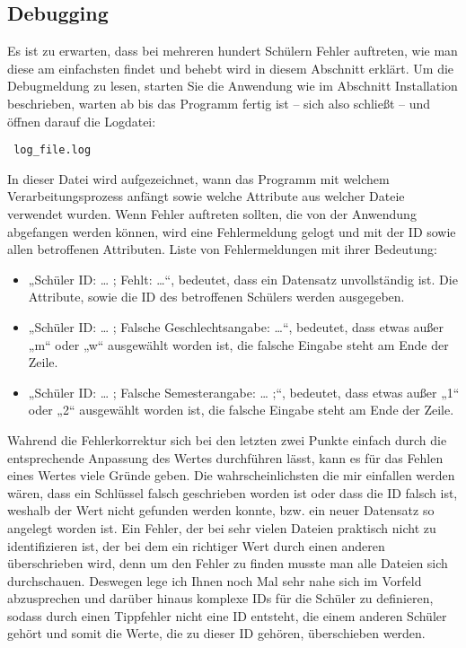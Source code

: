 \documentclass[a4paper,10pt]{scrartcl}
\begin{document}
   \subsection{Debugging}
   Es ist zu erwarten, dass bei mehreren hundert Schülern Fehler auftreten, wie man diese am einfachsten findet und behebt wird in diesem Abschnitt erklärt.
   Um die Debugmeldung zu lesen, starten Sie die Anwendung wie im Abschnitt Installation beschrieben, warten ab bis das Programm fertig ist – sich also schließt – und öffnen darauf die Logdatei:
   \begin{verbatim} log_file.log \end{verbatim}
   In dieser Datei wird aufgezeichnet, wann das Programm mit welchem Verarbeitungsprozess anfängt sowie welche Attribute aus welcher Dateie verwendet wurden.
   \newline
   Wenn Fehler auftreten sollten, die von der Anwendung abgefangen werden können, wird eine Fehlermeldung gelogt und mit der ID sowie allen betroffenen Attributen. 
   Liste von Fehlermeldungen mit ihrer Bedeutung:
   \begin{itemize}
      \item „Schüler ID: … ; Fehlt: …“, bedeutet, dass ein Datensatz unvollständig ist. Die Attribute, sowie die ID des betroffenen Schülers werden ausgegeben.
      \item „Schüler ID: … ; Falsche Geschlechtsangabe: …“, bedeutet, dass etwas außer „m“ oder „w“ ausgewählt worden ist, die falsche Eingabe steht am Ende der Zeile.
      \item „Schüler ID: … ; Falsche Semesterangabe: … ;“, bedeutet, dass etwas außer „1“ oder „2“ ausgewählt worden ist, die falsche Eingabe steht am Ende der Zeile. 
   \end{itemize} 
   Wahrend die Fehlerkorrektur sich bei den letzten zwei Punkte einfach durch die entsprechende Anpassung des Wertes durchführen lässt, kann es für das Fehlen eines Wertes viele Gründe geben. Die wahrscheinlichsten die mir einfallen werden wären, dass ein Schlüssel falsch geschrieben worden ist oder dass die ID falsch ist, weshalb der Wert nicht gefunden werden konnte, bzw. ein neuer Datensatz so angelegt worden ist. \newline
   Ein Fehler, der bei sehr vielen Dateien praktisch nicht zu identifizieren ist, der bei dem ein richtiger Wert durch einen anderen überschrieben wird, denn um den Fehler zu finden musste man alle Dateien sich durchschauen. Deswegen lege ich Ihnen noch Mal sehr nahe sich im Vorfeld abzusprechen und darüber hinaus komplexe IDs für die Schüler zu definieren, sodass durch einen Tippfehler nicht eine ID entsteht, die einem anderen Schüler gehört und somit die Werte, die zu dieser ID gehören, überschieben werden.
\end{document}
